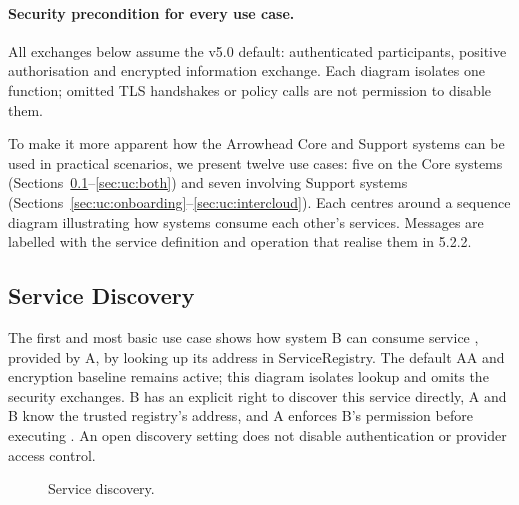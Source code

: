 \documentclass[a4paper]{arrowhead}
\newcommand{\svc}[1]{\textcolor{ArrowheadPurple}{\textit{\ahbreak{#1}}}}    %
\newcommand{\seqhead}[4]{\node[hd, #4] at (#2,0) {#3}; \draw[lifeline] (#2,-0.45) -- (#2,-#1);}
\begin{document}
\paragraph{Security precondition for every use case.}
All exchanges below assume the v5.0 default: authenticated participants, positive
authorisation and encrypted information exchange. Each diagram isolates one
function; omitted TLS handshakes or policy calls are not permission to disable them.


To make it more apparent how the Arrowhead Core and Support systems can be used in practical
scenarios, we present twelve use cases: five on the Core systems
(Sections~\ref{sec:uc:discovery}--\ref{sec:uc:both}) and seven involving Support systems
(Sections~\ref{sec:uc:onboarding}--\ref{sec:uc:intercloud}). Each centres around a sequence diagram illustrating how systems consume
each other's services. Messages are labelled with the service definition and operation that
realise them in 5.2.2.

\subsection{Service Discovery}
\label{sec:uc:discovery}

The first and most basic use case shows how system B can consume service \svc{a}, provided by
A, by looking up its address in ServiceRegistry. The default AA and encryption
baseline remains active; this diagram isolates lookup and omits the security
exchanges. B has an explicit right to discover this service directly, A and B know
the trusted registry's address, and A enforces B's permission before executing
\svc{a}. An open discovery setting does not disable authentication or provider
access control.

\begin{figure}[h!]
\centering
{}
\caption{Service discovery.}
\label{fig:uc1}
\end{figure}
\end{document}
